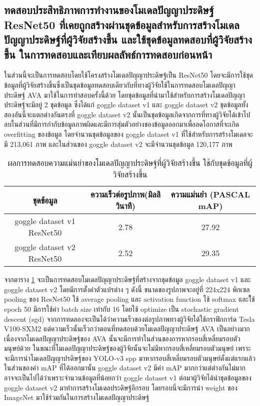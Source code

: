 \subsection{ทดสอบประสิทธิภาพการทำงานของโมเดลปัญญาประดิษฐ์ ResNet50 ที่เคยถูกสร้างผ่านชุดข้อมูลสำหรับการสร้างโมเดลปัญญาประดิษฐ์ที่ผู้วิจัยสร้างขึ้น และใช้ชุดข้อมูลทดสอบที่ผู้วิจัยสร้างขึ้น ในการทดสอบและเทียบผลลัพธ์การทดสอบก่อนหน้า}
ในส่วนนี้จะเป็นการทดสอบโดยใช้โครงสร้างโมเดลปัญญาประดิษฐ์เป็น ResNet50 โดยจะมีการใช้ชุดข้อมูลที่ผู้วิจัยสร้างขึ้นซึ่งเป็นชุดข้อมูลทดสอบเดียวกับที่ทางผู้วิจัยใช้ในการทดสอบโมเดลปัญญาประดิษฐ์ AVA มาใช้ในการทำสอบครั้งนี้ด้วย โดยชุดข้อมูลที่นำมาใช้สำหรับการสร้างโมเดลปัญญาประดิษฐ์จะมีอยู่ 2 ชุดข้อมูล ซึ่งได้แก่ goggle dataset v1 และ goggle dataset v2 ชุดข้อมูลทั้งสองอันนี้จะแตกต่างกันตรงที่ goggle dataset v2 นั้นเป็นชุดข้อมูลเกิดจากการที่ทางผู้วิจัยได้เข้าไปลบในส่วนที่มีการกำกับข้อมูลภาพผิดและมีการสุ่มตัวอย่างของข้อมูลออกมาเพื่อลดโอกาสที่จะเกิด overfitting ของข้อมูล โดยจำนวนชุดข้อมูลของ goggle dataset v1 ที่ใช้สำหรับการสร้างโมเดลจะมี 213,061 ภาพ และในส่วนของ goggle dataset v2 จะมีจำนวนชุดข้อมูล 120,177 ภาพ
\begin{table}[!ht]
	\centering
	\begin{tabular}{|c|c|c|}
			\hline
			{ชุดข้อมูล}&{ความเร็วต่อรูปภาพ(มิลลิวินาที)}&{ความแม่นยำ (PASCAL mAP)}			\\
			\hline
			goggle dataset v1 ResNet50			& 2.78			& 27.92				\\
			goggle dataset v2 ResNet50			& 2.52			& 29.35				\\
			\hline
	\end{tabular}
\caption{ผลการทดสอบความแม่นยำของโมเดลปัญญาประดิษฐ์ที่ผู้วิจัยสร้างขึ้น ใช้กับชุดข้อมูลที่ผู้วิจัยสร้างขึ้น}
\label{tab: Test PASCAL mAP of dataset created by the researcher}
\end{table}
จากตาราง \ref{tab: Test PASCAL mAP of dataset created by the researcher} จะเป็นการทดสอบโมเดลปัญญาประดิษฐ์ที่สร้างจากชุดข้อมูล goggle dataset v1 และ goggle dataset v2 โดยมีการตั้งค่าตัวแปรต่าง ๆ ดังนี้ ขนาดของรูปภาพจะอยู่ที่ 224x224 พิกเซล pooling ของ ResNet50 ใช้ average pooling และ activation function ใช้ softmax และใ้ช้ epoch 50 มีการใช้ค่า batch size เท่ากับ 16 โดยใช้ optimize เป็น stochastic gradient descent (sgd) จากการทดลองจะเป็นได้ว่าความเร็วของต่อรูปภาพทางผู้วิจัยได้ใช้กราฟิกการ์ด Tesla V100-SXM2 แต่ความเร็วนั้นเร็วกว่าตอนที่ทดสอบด้วยโมเดลปัญญาประดิษฐ์ AVA เป็นอย่างมาก เนื่องจากโมเดลปัญญาประดิษฐ์ของ AVA นั้นจะมีการทำในส่วนของการหากรอบสี่เหลี่ยมรอบตัวมนุษย์ด้วย ในขณะที่โมเดลปัญญาประดิษฐ์ของผู้วิจัยนั้นจะไม่มีหากรอบสี่เหลี่ยมรอบตัวมนุษย์ เพราะจะมีการนำโมเดลปัญญาปรดิษฐ์ของ YOLO-v3 spp มาหากรอบสี่เหลี่ยมรอบตัวมนุษย์ตั้งแต่แรกแล้ว ในส่วนของค่า mAP ที่ได้ออกมานั้น goggle dataset v2 มีค่า mAP มากกว่าแต่ต่างกันไม่มาก อาจจะเป็นไปได้ว่าเพราะจำนวนข้อมูลที่น้อยกว่า goggle dataset v1 ต่อมาผู้วิจัยได้นำชุดข้อมูลของ goggle dataset v2 มาทำการสร้างโมเดลประดิษฐ์อีกรอบ โดยรอบนี่จะมีการนำ weight ของ ImageNet มาใช้ร่วมกันในการสร้างโมเดลปัญญาประดิษฐ์


